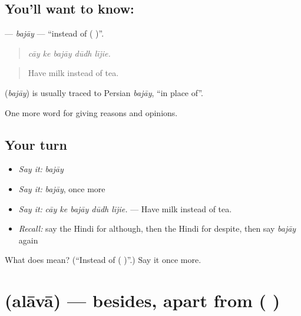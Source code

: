 \subsection*{You'll want to know: }
\textbf{} — \emph{bajāy} — \textquotedblleft{}instead of ( )\textquotedblright{}.

\begin{quote}
    
\end{quote}

\begin{quote}
\emph{cāy ke bajāy dūdh lījie.}
\end{quote}

\begin{quote}
Have milk instead of tea.
\end{quote}

\begin{cousinweb}
\textbf{} (\emph{bajāy}) is usually traced to Persian \emph{bajāy}, \textquotedblleft{}in place of\textquotedblright{}.
\end{cousinweb}

\begin{grammarlens}[title={What you've built}]
One more word for giving reasons and opinions.
\end{grammarlens}

\subsection*{Your turn}
\begin{itemize}
\raggedright
  \item \emph{Say it:} \emph{bajāy}
  \item \emph{Say it:} \emph{bajāy}, once more
  \item \emph{Say it:} \emph{cāy ke bajāy dūdh lījie.} — Have milk instead of tea.
  \item \emph{Recall:} say the Hindi for although, then the Hindi for despite, then say \emph{bajāy} again
\end{itemize}

\begin{tcolorbox}[breakable,colback=teal!4,colframe=teal!35!black,title={Before you move on}]
What does  mean? (\textquotedblleft{}Instead of ( )\textquotedblright{}.) Say it once more.
\end{tcolorbox}
\section[\texorpdfstring{\hi{अलावा} (alāvā)}{अलावा (alāvā)}]{ (alāvā) — besides, apart from ( )}

